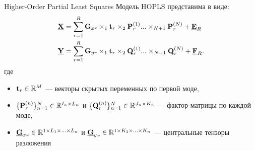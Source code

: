 \begin{frame}{Higher-Order Partial Least Squares}
Модель HOPLS представима в виде:
 $$
\begin{aligned}[t]
    \underline{\textbf{X}} &= \sum_{r=1}^{R}\textbf{G}_{xr}
    \times_1\textbf{t}_r
    \times_2\textbf{P}_r^{(1)}
    ...
    \times_{N+1}\textbf{P}_r^{(N)}
    + \underline{\textbf{E}}_R\\
    \underline{\textbf{Y}} &= \sum_{r=1}^{R}\textbf{G}_{yr}
    \times_1\textbf{t}_r
    \times_2\textbf{Q}_r^{(1)}
    ...
    \times_{N+1}\textbf{Q}_r^{(N)}
    + \underline{\textbf{F}}_R.
\end{aligned}
 $$
где
\begin{itemize}
    \item $\textbf{t}_r \in \mathbb{R}^M$ --- векторы скрытых переменных по первой моде,
    \item $\{\textbf{P}_r^{(n)}\}_{n=1}^N \in \mathbb{R}^{I_n\times L_n} $ и $\{\textbf{Q}_r^{(n)}\}_{n=1}^N \in \mathbb{R}^{J_n\times K_n} $ --- фактор-матрицы по каждой моде,
    \item ${\underline{\textbf{G}}_{x}}_r\in  \mathbb{R}^{1\times L_1\times...\times L_n}$ и ${\underline{\textbf{G}}_{y}}_r\in  \mathbb{R}^{1\times K_1\times...\times K_n}$ --- центральные тензоры разложения
\end{itemize}
\end{frame}

